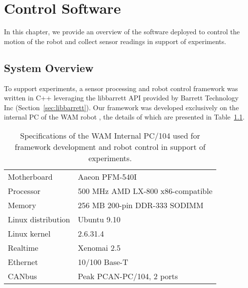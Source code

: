 \chapter{Control Software}
\label{chap4}

In this chapter, we provide an overview of the software deployed to control the motion of the robot and collect sensor readings in support of experiments.


\section{System Overview}
To support experiments, a sensor processing and robot control framework was written in C++ leveraging the libbarrett API provided by Barrett Technology Inc (Section~\ref{sec:libbarrett}). 
Our framework was developed exclusively on the internal PC of the WAM robot \cite{townsend1993mechanical}, the details of which are presented in Table~\ref{tbl:wam_specs}.

\begin{table}[h]
\centering
\begin{tabular}{|l|l|}
\hline
Motherboard        & Aaeon PFM-540I                    \\
Processor          & 500 MHz AMD LX-800 x86-compatible \\
Memory             & 256 MB 200-pin DDR-333 SODIMM     \\
Linux distribution & Ubuntu 9.10                       \\
Linux kernel       & 2.6.31.4                          \\
Realtime           & Xenomai 2.5                       \\
Ethernet           & 10/100 Base-T                     \\
CANbus             & Peak PCAN-PC/104, 2 ports         \\ \hline
\end{tabular}
\caption{Specifications of the WAM Internal PC/104 \cite{wam_specs} used for framework development and robot control in support of experiments.}
\label{tbl:wam_specs}
\end{table}

